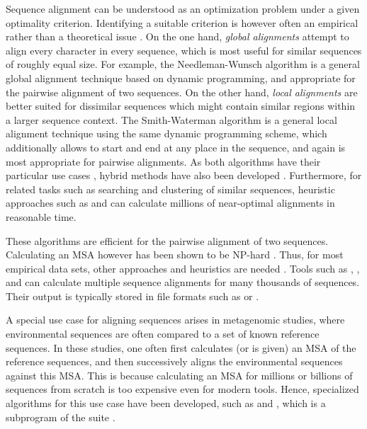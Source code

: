 Sequence alignment can be understood as an optimization problem under a given optimality criterion.
Identifying a suitable criterion is however often an empirical rather than a theoretical issue \cite{Vingron1994,Carroll2007}.
On the one hand, \emph{global alignments} attempt to align every character in every sequence,
which is most useful for similar sequences of roughly equal size.
For example, the Needleman-Wunsch algorithm \cite{Needleman1970} is a general global alignment technique
based on dynamic programming, and appropriate for the pairwise alignment of two sequences.
On the other hand, \emph{local alignments} are better suited for dissimilar sequences
which might contain similar regions within a larger sequence context.
The Smith-Waterman algorithm \cite{Smith1981} is a general local alignment technique
using the same dynamic programming scheme,
which additionally allows to start and end at any place in the sequence,
and again is most appropriate for pairwise alignments.
As both algorithms have their particular use cases \cite{Polyanovsky2011},
hybrid methods have also been developed \cite{Brudno2003}.
Furthermore, for related tasks such as searching and clustering of similar sequences,
heuristic approaches such as  \cite{Altschul1990} and
 \cite{Edgar2010} can calculate millions of near-optimal alignments in reasonable time.

These algorithms are efficient for the pairwise alignment of two sequences.
Calculating an MSA however has been shown to be NP-hard \cite{Wang1994,Just2001}.
Thus, for most empirical data sets, other approaches and heuristics are needed \cite{Thompson2011}.
Tools such as  \cite{Higgins1988},  \cite{Edgar2004}, and  \cite{Katoh2002}
can calculate multiple sequence alignments for many thousands of sequences.
Their output is typically stored in file formats
such as  \cite{Pearson1988} or  \cite{Felsenstein1981}.

A special use case for aligning sequences arises in metagenomic studies,
where environmental sequences are often compared to a set of known reference sequences.
In these studies, one often first calculates (or is given) an MSA of the reference sequences,
and then successively aligns the environmental sequences against this MSA.
This is because calculating an MSA for millions or billions of sequences from scratch is too expensive even for modern tools.
Hence, specialized algorithms for this use case have been developed,
such as  \citep{Berger2011a,Berger2012} and
, which is a subprogram of the  suite \citep{Eddy1998,Eddy2009}.

